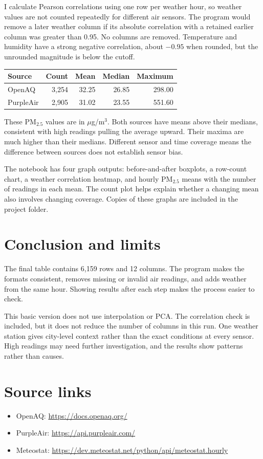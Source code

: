 \documentclass[11pt,a4paper]{article}
\begin{document}
I calculate Pearson correlations using one row per weather hour, so weather values are not counted repeatedly for different air sensors. The program would remove a later weather column if its absolute correlation with a retained earlier column was greater than 0.95. No columns are removed. Temperature and humidity have a strong negative correlation, about $-0.95$ when rounded, but the unrounded magnitude is below the cutoff.
\begin{center}
\begin{tabular}{lrrrr}\toprule
Source & Count & Mean & Median & Maximum \\\midrule
OpenAQ & 3,254 & 32.25 & 26.85 & 298.00 \\
PurpleAir & 2,905 & 31.02 & 23.55 & 551.60 \\\bottomrule
\end{tabular}
\end{center}
These PM$_{2.5}$ values are in $\mu$g/m$^3$. Both sources have means above their medians, consistent with high readings pulling the average upward. Their maxima are much higher than their medians. Different sensor and time coverage means the difference between sources does not establish sensor bias.

The notebook has four graph outputs: before-and-after boxplots, a row-count chart, a weather correlation heatmap, and hourly PM$_{2.5}$ means with the number of readings in each mean. The count plot helps explain whether a changing mean also involves changing coverage. Copies of these graphs are included in the project folder.
\section{Conclusion and limits}
The final table contains 6,159 rows and 12 columns. The program makes the formats consistent, removes missing or invalid air readings, and adds weather from the same hour. Showing results after each step makes the process easier to check.

This basic version does not use interpolation or PCA. The correlation check is included, but it does not reduce the number of columns in this run. One weather station gives city-level context rather than the exact conditions at every sensor. High readings may need further investigation, and the results show patterns rather than causes.
\section*{Source links}
\begin{itemize}
\item OpenAQ: \url{https://docs.openaq.org/}
\item PurpleAir: \url{https://api.purpleair.com/}
\item Meteostat: \url{https://dev.meteostat.net/python/api/meteostat.hourly}
\end{itemize}
\end{document}
